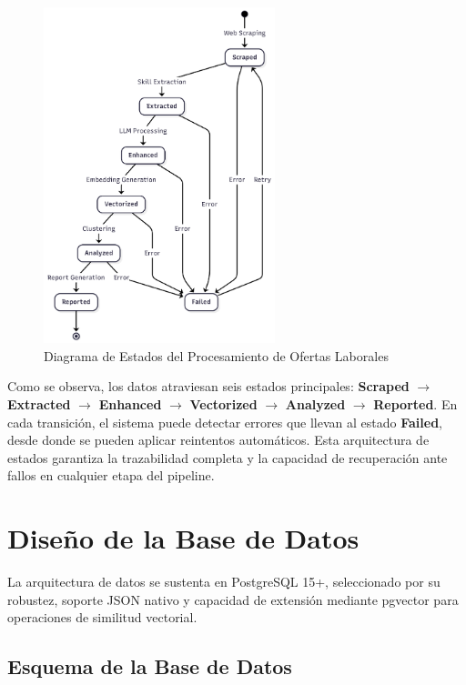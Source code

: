 \begin{figure}[H]
\centering
\includegraphics[width=0.6\textwidth]{diagrams/DiagramaEstado.png}
\caption{Diagrama de Estados del Procesamiento de Ofertas Laborales}
\label{fig:estados-jobs}
\end{figure}

Como se observa, los datos atraviesan seis estados principales: \textbf{Scraped} $\rightarrow$ \textbf{Extracted} $\rightarrow$ \textbf{Enhanced} $\rightarrow$ \textbf{Vectorized} $\rightarrow$ \textbf{Analyzed} $\rightarrow$ \textbf{Reported}. En cada transición, el sistema puede detectar errores que llevan al estado \textbf{Failed}, desde donde se pueden aplicar reintentos automáticos. Esta arquitectura de estados garantiza la trazabilidad completa y la capacidad de recuperación ante fallos en cualquier etapa del pipeline.

\section{Diseño de la Base de Datos}

La arquitectura de datos se sustenta en PostgreSQL 15+, seleccionado por su robustez, soporte JSON nativo y capacidad de extensión mediante pgvector para operaciones de similitud vectorial.

\subsection{Esquema de la Base de Datos}

